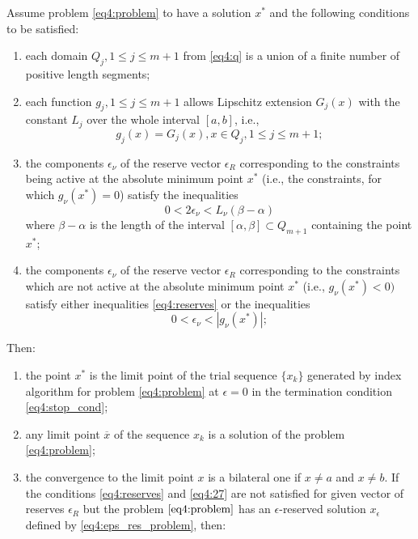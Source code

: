 \begin{theorem}
  Assume problem \eqref{eq4:problem} to have a solution $x^*$ and the following conditions to be satisfied:
  \begin{enumerate}
    \item each domain $Q_j ,1\le j\le m+1$ from \eqref{eq4:q} is a union of a finite number of positive length segments;
    \item each function $g_j ,1\le j\le m+1$ allows Lipschitz extension $G_j (x)$ with the constant $L_j$ over the whole interval $[a,b]$, i.e.,
    \begin{equation}
      g_j(x)=G_j(x),x\in Q_j,1\le j\le m+1;
    \end{equation}
    \item the components $\epsilon_\nu$ of the reserve vector $\epsilon_R$ corresponding to the constraints being active at the absolute minimum point $x^*$ (i.e., the constraints, for which $g_\nu(x^*)=0$) satisfy the inequalities
    \begin{equation}
      \label{eq4:reserves}
      0<2\epsilon_\nu<L_\nu(\beta-\alpha)
    \end{equation}
    where $\beta-\alpha$ is the length of the interval $[\alpha,\beta]\subset Q_{m + 1}$ containing the point $x^*$;
    \item the components $\epsilon_\nu$ of the reserve vector $\epsilon_R$ corresponding to the constraints which are not active at the absolute minimum point $x^*$ (i.e., $g_\nu(x^* )<0)$ satisfy either inequalities \eqref{eq4:reserves} or the inequalities
    \begin{equation}
      \label{eq4:27}
      0< \epsilon_\nu <|g_\nu (x^* )|;
    \end{equation}
  \end{enumerate}

  Then:
  \begin{enumerate}
    \item the point $x^*$ is the limit point of the trial sequence $\{x_k \}$ generated by index algorithm for problem \eqref{eq4:problem} at $\epsilon =0$ in the termination condition \eqref{eq4:stop_cond};
    \item any limit point $\overline x$ of the sequence ${x_k }$ is a solution of the problem \eqref{eq4:problem};
    \item the convergence to the limit point $x$ is a bilateral one if $x\not=a$ and $x\not=b$.
    If the conditions \eqref{eq4:reserves} and \eqref{eq4:27} are not satisfied for given vector of reserves $\epsilon_R$ but the
    problem $\eqref{eq4:problem}$ has an $\epsilon$-reserved solution $x_\epsilon$ defined by \eqref{eq4:eps_res_problem}, then:


\end{enumerate}
\end{theorem}
